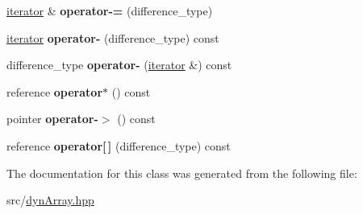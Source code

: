 \begin{DoxyCompactItemize}
\mbox{\label{classDyn__array_1_1iterator_a855dd62832c55b325a760f19c54c8d63}} 
\hyperlink{classDyn__array_1_1iterator}{iterator} \& {\bfseries operator-\/=} (difference\+\_\+type)
\item 
\mbox{\label{classDyn__array_1_1iterator_afcb42cada88bae05e7e14b19f9c76f94}} 
\hyperlink{classDyn__array_1_1iterator}{iterator} {\bfseries operator-\/} (difference\+\_\+type) const
\item 
\mbox{\label{classDyn__array_1_1iterator_afaae323f1b9684f35be97e7d57227879}} 
difference\+\_\+type {\bfseries operator-\/} (\hyperlink{classDyn__array_1_1iterator}{iterator} \&) const
\item 
\mbox{\label{classDyn__array_1_1iterator_a12cd41520c2d04cd913a4deff5a0644d}} 
reference {\bfseries operator$\ast$} () const
\item 
\mbox{\label{classDyn__array_1_1iterator_a33f61130769fd84d485adc71969c83d6}} 
pointer {\bfseries operator-\/$>$} () const
\item 
\mbox{\label{classDyn__array_1_1iterator_a384c6e6cc6ac080207c327c1b85c3d53}} 
reference {\bfseries operator\mbox{[}$\,$\mbox{]}} (difference\+\_\+type) const
\end{DoxyCompactItemize}


The documentation for this class was generated from the following file\+:\begin{DoxyCompactItemize}
\item 
src/\hyperlink{dynArray_8hpp}{dyn\+Array.\+hpp}\end{DoxyCompactItemize}

